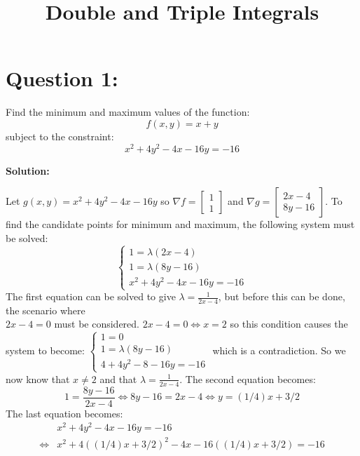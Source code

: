 \documentclass{article}
\title{Double and Triple Integrals}
\date{}
\newcommand{\dr}[1]{\textcolor{dark_red}{#1}}
\begin{document}
\maketitle



\section*{Question 1:}

Find the minimum and maximum values of the function:
\[f(x,y) = x + y\]
subject to the constraint:
\[x^2 + 4y^2 - 4x - 16y = -16\] 

\vspace{5mm}
\dr{\textbf{Solution:}}

\dr{Let \(g(x,y) = x^2 + 4y^2 - 4x - 16y\) so \(\nabla f = \begin{bmatrix} 1 \\ 1 \end{bmatrix}\) and \(\nabla g = \begin{bmatrix} 2x - 4 \\ 8y - 16 \end{bmatrix}\). To find the candidate points for minimum and maximum, the following system must be solved: 
\[\left\{\begin{array}{c} 1 = \lambda(2x - 4) \\ 1 = \lambda(8y - 16) \\ x^2 + 4y^2 - 4x - 16y = -16 \end{array}\right.\]
The first equation can be solved to give \(\lambda = \frac{1}{2x - 4}\), but before this can be done, the scenario where \\ \(2x - 4 = 0\) must be considered. \(2x - 4 = 0 \iff x = 2\) so this condition causes the system to become: 
\(\left\{\begin{array}{c} 1 = 0 \\ 1 = \lambda(8y - 16) \\ 4 + 4y^2 - 8 - 16y = -16 \end{array}\right.\)
which is a contradiction. So we now know that \(x \neq 2\) and that \(\lambda = \frac{1}{2x - 4}\). The second equation becomes:
\[1 = \frac{8y - 16}{2x - 4} \iff 8y - 16 = 2x - 4 \iff y = (1/4)x + 3/2\]
The last equation becomes:
\begin{align*}
& x^2 + 4y^2 - 4x - 16y = -16 \\
\iff & x^2 + 4((1/4)x + 3/2)^2 - 4x - 16((1/4)x + 3/2) = -16 \\

\end{align*}}
\end{document}
